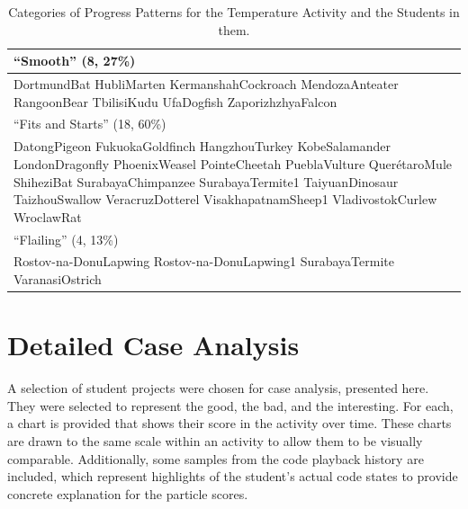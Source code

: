 \begin{table}
\begin{centering}
	\begin{tabular}{p{\textwidth}}
	\hline \hline
	``Smooth'' (8, 27\%)\\ \hline
		DortmundBat
		HubliMarten
		KermanshahCockroach
		MendozaAnteater
		RangoonBear
		TbilisiKudu
		UfaDogfish
		ZaporizhzhyaFalcon
		\\ \hline \hline
	``Fits and Starts'' (18, 60\%)\\ \hline
		DatongPigeon
		FukuokaGoldfinch
		HangzhouTurkey
		KobeSalamander
		LondonDragonfly
		PhoenixWeasel
		PointeCheetah
		PueblaVulture
		QuerétaroMule
		ShiheziBat
		SurabayaChimpanzee
		SurabayaTermite1
		TaiyuanDinosaur
		TaizhouSwallow
		VeracruzDotterel
		VisakhapatnamSheep1
		VladivostokCurlew
		WroclawRat
		\\ \hline \hline
	``Flailing'' (4, 13\%)\\ \hline
		Rostov-na-DonuLapwing
		Rostov-na-DonuLapwing1
		SurabayaTermite
		VaranasiOstrich
		\\ \hline

	\end{tabular}
	\caption[Categories of Progress Patterns for the Temperature Activity and the Students in them]{Categories of Progress Patterns for the Temperature Activity and the Students in them.}
	\label{tab:pattern_names_temp}
\end{centering}
\end{table}



\section{Detailed Case Analysis}
\label{sec:case_analysis}
A selection of student projects were chosen for case analysis, presented here. They were selected to represent the good, the bad, and the interesting. For each, a chart is provided that shows their score in the activity over time. These charts are drawn to the same scale within an activity to allow them to be visually comparable. Additionally, some samples from the code playback history are included, which represent highlights of the student's actual code states to provide concrete explanation for the particle scores.

